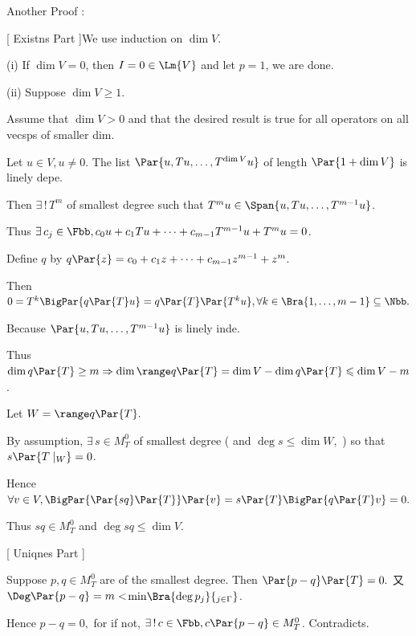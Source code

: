\BulletPointX\NoteFor{[8.40]} 
\Solution\Or Another Proof :\par\quad
{\Large[} {\tgsl\large Existns Part} {\Large]}\quad We use induction on $\dim V.$\par\quad
(i) If $\dim V = 0$, then $I=0\in\Lm{V}$ and let $p=1$, we are done.\par\quad\Endi
(ii) Suppose $\dim V\geqslant 1.$\par\quad\Hii
{\tgsl Assume that $\dim V > 0$ and that the desired result is true for all operators on all vecsps of smaller dim.}\par\quad\Hii
Let $u\in V,u\neq 0$. The list $\Par{u, Tu, \dots, T^{\dim V} u}$ of length $\Par{1 + \dim V}$ is linely depe.\par\quad\Hii
Then $\exists\,!\,T^m$ of smallest degree such that $T^m u\in\Span{u, Tu, \dots, T^{m-1} u}$.\par\quad\Hii
Thus $\exists\,c_j\in\Fbb,c_0 u + c_1 Tu +\dots + c_{m-1} T^{m-1} u + T^m u = 0$.\par\quad\Hii
Define $q$ by
$q\Par{z} = c_0 + c_1 z + \dots + c_{m-1} z^{m-1} + z^m$.\par\quad\Hii
Then $0=T^k\BigPar{q\Par{T}u}=q\Par{T}\Par{T^k u},\forall k\in\Bra{1,\dots,m-1}\subseteq\Nbb.$\par\quad\Hii
Because $\Par{u, Tu, \dots , T^{m-1} u}$ is linely inde.\par\quad\Hii
Thus $\dim\null q\Par{T} \geq m\Rightarrow\dim \range q\Par{T} = \dim V - \dim \null q\Par{T} \leqslant \dim V - m$.\par\vspace{5pt}\quad\Hii
Let $W=\range q\Par{T}.$\par\quad\Hii
By {\tgsl assumption}, $\exists\,s\in M_T^0$ of smallest degree ( and $\deg s\leqslant\dim W,$ ) so that $s\Par{T\mid_W } = 0$.\par\quad\Hii
Hence $\forall v\in V,\BigPar{\Par{sq}\Par{T}}\Par{v} = s\Par{T}\BigPar{q\Par{T}v} = 0.$\par\quad\Hii
Thus $sq\in M_T^0$ and $\deg sq\leqslant \dim V$.\par\vspace{5pt}\quad
{\Large[} {\tgsl\large Uniqnes Part} {\Large]}\par\quad
Suppose $p,q\in M_T^0$ are of the smallest degree. Then $\Par{p-q}\Par{T}=0.$ 又 $\Deg\Par{p-q}=m<${\envFontSmall\normalsize$\min\!\Bra{\deg p_j}{_{j\in\Gamma}}$}.\par\quad
Hence $p-q=0,$ for if not, $\exists\,!\,c\in\Fbb,c\Par{p-q}\in M_T^0$. Contradicts.\PfEnd
\SepLine


